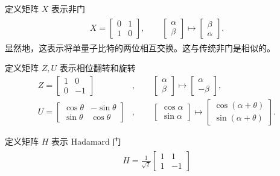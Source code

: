 定义矩阵 $X$ 表示非门 \begin{align}\begin{aligned}
        X=\begin{bmatrix}
              0 & 1 \\
              1 & 0
          \end{bmatrix},\qquad
        \begin{bmatrix}
            \alpha \\\beta
        \end{bmatrix}\mapsto
        \begin{bmatrix}
            \beta \\\alpha
        \end{bmatrix}.
    \end{aligned}\end{align}
显然地，这表示将单量子比特的两位相互交换。这与传统非门是相似的。

定义矩阵 $Z,U$ 表示相位翻转和旋转 \begin{align}
    Z=\begin{bmatrix}
          1 & 0  \\
          0 & -1
      \end{bmatrix}           & ,\qquad
    \begin{bmatrix}
        \alpha \\\beta
    \end{bmatrix}\mapsto
    \begin{bmatrix}
        \alpha \\-\beta
    \end{bmatrix},                      \\
    U=\begin{bmatrix}
          \cos\theta & -\sin\theta \\
          \sin\theta & \cos\theta
      \end{bmatrix} & ,\qquad
    \begin{bmatrix}
        \cos\alpha \\\sin\alpha
    \end{bmatrix}\mapsto 
    \begin{bmatrix}
        \cos(\alpha+\theta) \\\sin(\alpha+\theta)
    \end{bmatrix}.
\end{align}

定义矩阵 $H$ 表示 Hadamard 门 \begin{align}\begin{aligned}
        H=\frac{1}{\sqrt{2}}\begin{bmatrix}
                                1 & 1  \\
                                1 & -1
                            \end{bmatrix}\label{eq:hadamard}
    \end{aligned}\end{align}

